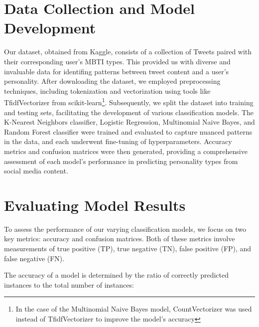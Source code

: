 \documentclass[pmlr,twocolumn]{jmlr} %
\begin{document}
\section{Data Collection and Model Development}
Our dataset, obtained from Kaggle, consists of a collection of Tweets paired with their corresponding user's MBTI types. This provided us with diverse and invaluable data for identifing patterns between tweet content and a user's personality. After downloading the dataset, we employed preprocessing techniques, including tokenization and vectorization using tools like TfidfVectorizer from scikit-learn\footnote{In the case of the Multinomial Naive Bayes model, CountVectorizer was used instead of TfidfVectorizer to improve the model's accuracy}. Subsequently, we split the dataset into training and testing sets, facilitating the development of various classification models. The K-Nearest Neighbors classifier, Logistic Regression, Multinomial Naive Bayes, and Random Forest classifier were trained and evaluated to capture nuanced patterns in the data, and each underwent fine-tuning of hyperparameters. Accuracy metrics and confusion matrices were then generated, providing a comprehensive assessment of each model's performance in predicting personality types from social media content.

\section{Evaluating Model Results}
To assess the performance of our varying classification models, we focus on two key metrics: accuracy and confusion matrices. Both of these metrics involve measurements of true positive (TP), true negative (TN), false positive (FP), and false negative (FN).

The accuracy of a model is determined by the ratio of correctly predicted instances to the total number of instances:
\end{document}
